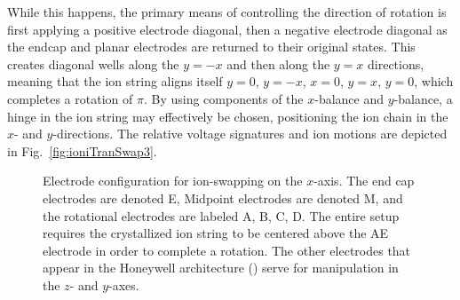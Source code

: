 \documentclass[12pt,a4paper]{amsart}
\numberwithin{equation}{section}
\theoremstyle{plain}
\theoremstyle{definition}
\begin{document}
While this happens, the primary means of controlling the direction of rotation is first applying a positive electrode diagonal, then a negative electrode diagonal as the endcap and planar electrodes are returned to their original states. This creates diagonal wells along the $y=-x$ and then along the $y=x$ directions, meaning that the ion string aligns itself $y=0$, $y=-x$, $x=0$, $y=x$, $y=0$, which completes a rotation of $\pi$. By using components of the $x$-balance and $y$-balance, a hinge in the ion string may effectively be chosen, positioning the ion chain in the $x$- and $y$-directions.
The relative voltage signatures and ion motions are depicted in Fig.~\ref{fig:ioniTranSwap3}.
\begin{figure}
\centering
{}
    \caption{Electrode configuration for ion-swapping on the $x$-axis. The end cap electrodes are denoted E, Midpoint electrodes are denoted M, and the rotational electrodes are labeled A, B, C, D. The entire setup requires the crystallized ion string to be centered above the AE electrode in order to complete a rotation. The other electrodes that appear in the Honeywell architecture () serve for manipulation in the $z$- and $y$-axes.}
    \label{fig:ioniTranSwap2}
\end{figure}
\end{document}
